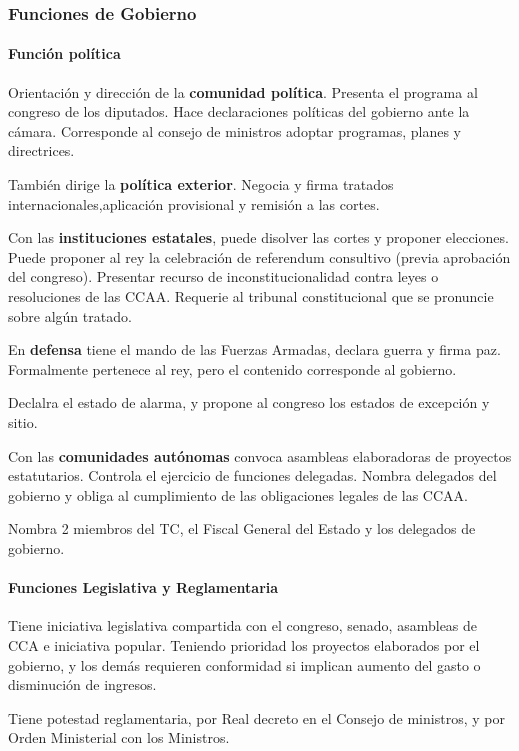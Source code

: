     \subsubsection{Funciones de Gobierno}
        \paragraph{Función política}
            Orientación y dirección de la \textbf{comunidad política}. Presenta el programa al congreso de los diputados. Hace declaraciones políticas del gobierno ante la cámara. Corresponde al consejo de ministros adoptar programas, planes y directrices.

            También dirige la \textbf{política exterior}. Negocia y firma tratados internacionales,aplicación provisional y remisión a las cortes.

            Con las \textbf{instituciones estatales}, puede disolver las cortes y proponer elecciones. Puede proponer al rey la celebración de referendum consultivo (previa aprobación del congreso). Presentar recurso de inconstitucionalidad contra leyes o resoluciones de las CCAA. Requerie al tribunal constitucional que se pronuncie sobre algún tratado.

            En \textbf{defensa} tiene el mando de las Fuerzas Armadas, declara guerra y firma paz. Formalmente pertenece al rey, pero el contenido corresponde al gobierno.

            Declalra el estado de alarma, y propone al congreso los estados de excepción y sitio.

            Con las \textbf{comunidades autónomas} convoca asambleas elaboradoras de proyectos estatutarios. Controla el ejercicio de funciones delegadas. Nombra delegados del gobierno y obliga al cumplimiento de las obligaciones legales de las CCAA.

            Nombra 2 miembros del TC, el Fiscal General del Estado y los delegados de gobierno.
        
        \paragraph{Funciones Legislativa y Reglamentaria}
            Tiene iniciativa legislativa compartida con el congreso, senado, asambleas de CCA e iniciativa popular. Teniendo prioridad los proyectos elaborados por el gobierno, y los demás requieren conformidad si implican aumento del gasto o disminución de ingresos.

            Tiene potestad reglamentaria, por Real decreto en el Consejo de ministros, y por Orden Ministerial con los Ministros.
        
